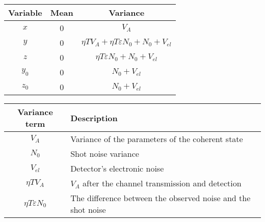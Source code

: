 \documentclass[5pt]{article}
\begin{document}
\begin{center}
	\begin{tabular}{c c c}
		\hline
		\textbf{Variable}	& \textbf{Mean}		& \textbf{Variance}\\
		\hline
		$x$					& 0					& $V_A$\\
		$y$					& 0					& $\eta T V_A + \eta T \varepsilon N_0 + N_0 + V_{el}$\\
		$z$					& 0					& $\eta T \varepsilon N_0 + N_0 + V_{el}$\\
		$y_0$				& 0					& $N_0 + V_{el}$\\
		$z_0$				& 0					& $N_0 + V_{el}$\\
		\hline
	\end{tabular}
\end{center}

\vspace{1em}

\begin{center}
	\begin{tabular}{c p{12cm}}
		\hline
		\textbf{Variance term}		& \textbf{Description}\\	
		\hline
		$V_A$						& \small{Variance of the parameters of the coherent state}\\ 
		$N_0$						& \small{Shot noise variance}\\
		$V_{el}$					& \small{Detector's electronic noise}\\
		$\eta T V_A$				& \small{$V_A$ after the channel transmission and detection}\\ 
		$\eta T \varepsilon N_0$	& \small{The difference between the observed noise and the shot noise}
		\hline
	\end{tabular}
\end{center}
\end{document}
